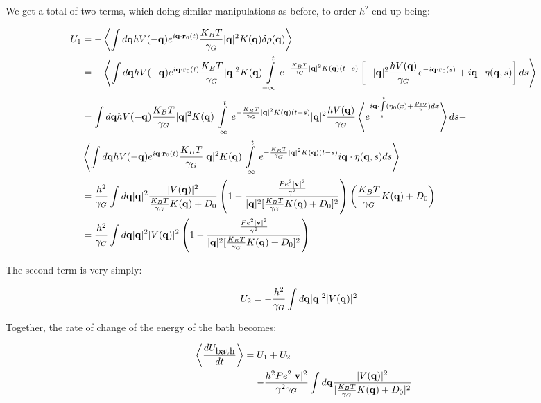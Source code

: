 \documentclass[amsmath,preprintnumbers,10pt,article,notitlepage]{revtex4-1}
\begin{document}
We get a total of two terms, which doing similar manipulations as before, to order $h^2$ end up being:

\begin{align}
U_1 &  = - \left \langle \int d {\bf q} h V(-{\bf q}) e^{i{\bf q} \cdot {\bf r}_0(t)} \dfrac{K_BT}{\gamma_G} |{\bf q}|^2 K({\bf q}) \delta \rho({\bf q})   \right \rangle \\
& =  - \left \langle \int d {\bf q} h V(-{\bf q}) e^{i{\bf q} \cdot {\bf r}_0(t)} \dfrac{K_BT}{\gamma_G} |{\bf q}|^2 K({\bf q} )    \int\limits_{-\infty}^t e^{-\frac{K_BT}{\gamma_G}|{\bf q}|^2 K({\bf q})(t-s)}\left[-|{\bf q}|^2 \dfrac{h V({\bf q})}{\gamma_G} e^{-i {\bf q}\cdot {\bf r}_0(s)}+  i{\bf q} \cdot \eta({\bf q},s)\right] ds   \right \rangle  \\
& =  \int d {\bf q} h V(-{\bf q})  \dfrac{K_BT}{\gamma_G} |{\bf q}|^2 K({\bf q} )    \int\limits_{-\infty}^t e^{-\frac{K_BT}{\gamma_G}|{\bf q}|^2 K({\bf q})(t-s)} |{\bf q}|^2 \dfrac{h V({\bf q})}{\gamma_G}  \left \langle  e^{i{\bf q} \cdot \int\limits_{s}^t ( \eta_0(x) + \frac{Pe{\bf v} }{\gamma}) dx}   \right \rangle ds   - \\
& \left \langle \int d {\bf q} h V(-{\bf q}) e^{i{\bf q} \cdot {\bf r}_0(t)} \dfrac{K_BT}{\gamma_G} |{\bf q}|^2 K({\bf q} )    \int\limits_{-\infty}^t e^{-\frac{K_BT}{\gamma_G}|{\bf q}|^2 K({\bf q})(t-s)} i{\bf q} \cdot \eta({\bf q},s) ds   \right \rangle \\
& = \frac{h^2}{\gamma_G} \int d{\bf q} |{\bf q}|^2  \dfrac{ |V({\bf q})|^2}{ \frac{K_BT}{\gamma_G} K({\bf q}) + D_0} \left( 1- \dfrac{ \frac{Pe^2 |{\bf v}|^2}{\gamma^2}}{|{\bf q}|^2 [\frac{K_BT}{\gamma_G} K({\bf q}) + D_0 ]^2 }  \right) \left( \dfrac{K_B T}{\gamma_G}K({\bf q}) + D_0 \right) \\
& = \frac{h^2}{\gamma_G} \int d{\bf q} |{\bf q}|^2   |V({\bf q})|^2\left( 1- \dfrac{ \frac{Pe^2 |{\bf v}|^2}{\gamma^2}}{|{\bf q}|^2 [\frac{K_BT}{\gamma_G} K({\bf q}) + D_0 ]^2 }  \right)
\end{align}

The second term is very simply:

\begin{align}
U_2 &  = -\frac{h^2}{\gamma_G} \int d{\bf q} |{\bf q}|^2   |V({\bf q})|^2 
\end{align}


Together, the rate of change of the energy of the bath becomes:

\begin{align}
\left \langle \dfrac{dU_{\mbox{bath}}}{dt}  \right \rangle & = U_1 + U_2 \\
& = - \frac{h^2 Pe^2 |{\bf v}|^2}{ \gamma^2 \gamma_G} \int d{\bf q}  \dfrac{|V({\bf q})|^2}{ [\frac{K_BT}{\gamma_G} K({\bf q}) + D_0 ]^2 } 
\label{eq:dubath}
\end{align}
\end{document}
